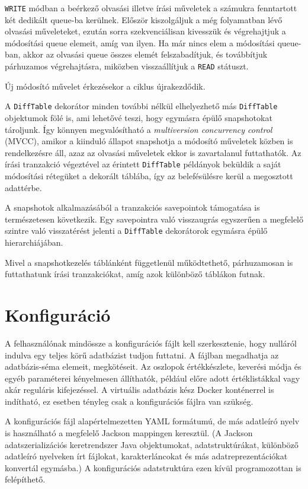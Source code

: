 \documentclass[
    parspace,
    noindent,
    nohyp,
]{elteiktdk}[2023/04/10]
\newcommand{\todoref}[1]{\todo[inline, noinlinepar, color=red, textcolor=white, inlinewidth=0.6cm, caption={#1}]{\large \textbf{×}}}
\begin{document}
\texttt{WRITE} módban a beérkező olvasási illetve írási műveletek
a számukra fenntartott két dedikált queue-ba kerülnek.
Először kiszolgáljuk a még folyamatban lévő olvasási műveleteket,
ezután sorra szekvenciálisan kivesszük és végrehajtjuk a módosítási queue elemeit, amíg van ilyen.
Ha már nincs elem a módosítási queue-ban,
akkor az olvasási queue összes elemét felszabadítjuk, és továbbítjuk párhuzamos végrehajtásra,
miközben visszaállítjuk a \texttt{READ} státuszt.

Új módosító művelet érkezésekor a ciklus újrakezdődik.

A \texttt{DiffTable} dekorátor minden további nélkül elhelyezhető
más \texttt{DiffTable} objektumok fölé is, ami lehetővé teszi, hogy egymásra épülő snapshotokat tároljunk.
Így könnyen megvalósítható a \textit{multiversion concurrency control} (MVCC),
amikor a kiinduló állapot snapshotja a módosító műveletek közben is rendelkezésre áll,
azaz az olvasási műveletek ekkor is zavartalanul futtathatók.
Az írási tranzakció végeztével az érintett \texttt{DiffTable} példányok
beküldik a saját módosítási rétegüket a dekorált táblába,
így az belefésülésre kerül a megosztott adattérbe.

A snapshotok alkalmazásából a tranzakciós savepointok támogatása is természetesen következik.
Egy savepointra való visszaugrás egyszerűen a megfelelő szintre való visszatérést jelenti
a \texttt{DiffTable} dekorátorok egymásra épülő hierarchiájában.

Mivel a snapshotkezelés táblánként függetlenül működtethető,
párhuzamosan is futtathatunk írási tranzakciókat,
amíg azok különböző táblákon futnak.


\section{Konfiguráció}

A felhasználónak mindössze a konfigurációs fájlt kell szerkesztenie,
hogy nulláról indulva egy teljes körű adatbázist tudjon futtatni.
A fájlban megadhatja az adatbázis-séma elemeit, megkötéseit.
Az oszlopok értékkészlete, keverési módja és egyéb paraméterei kényelmesen állíthatók,
például előre adott értéklistákkal vagy akár reguláris kifejezéssel.
A virtuális adatbázis kész Docker konténerrel is indítható,
ez esetben tényleg csak a konfigurációs fájlra van szükség.

A konfigurációs fájl alapértelmezetten YAML formátumú,
de más adatleíró nyelv is használható
a megfelelő Jackson mappingen keresztül.
(A Jackson adatszerializációs keretrendszer Java objektumokat, adatstruktúrákat,
különböző adatleíró nyelveken írt fájlokat, karakterláncokat
és más adatreprezentációkat konvertál egymásba.)\todoref{Jackson: kicsit jobban bevezetni}
A konfigurációs adatstruktúra ezen kívül programozottan is felépíthető.
\end{document}
